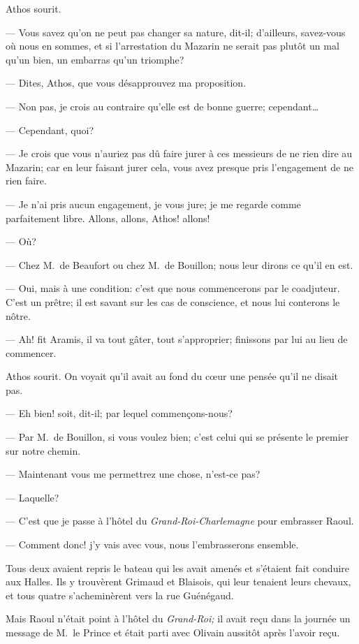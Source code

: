 Athos sourit.

— Vous savez qu'on ne peut pas changer sa nature, dit-il; d'ailleurs, savez-vous où nous en sommes, et si l'arrestation du Mazarin ne serait pas plutôt un mal qu'un bien, un embarras qu'un triomphe?

— Dites, Athos, que vous désapprouvez ma proposition.

— Non pas, je crois au contraire qu'elle est de bonne guerre; cependant\dots

— Cependant, quoi?

— Je crois que vous n'auriez pas dû faire jurer à ces messieurs de ne rien dire au Mazarin; car en leur faisant jurer cela, vous avez presque pris l'engagement de ne rien faire.

— Je n'ai pris aucun engagement, je vous jure; je me regarde comme parfaitement libre. Allons, allons, Athos! allons!

— Où?

— Chez M.~de Beaufort ou chez M.~de Bouillon; nous leur dirons ce qu'il en est.

— Oui, mais à une condition: c'est que nous commencerons par le coadjuteur. C'est un prêtre; il est savant sur les cas de conscience, et nous lui conterons le nôtre.

— Ah! fit Aramis, il va tout gâter, tout s'approprier; finissons par lui au lieu de commencer.

Athos sourit. On voyait qu'il avait au fond du cœur une pensée qu'il ne disait pas.

— Eh bien! soit, dit-il; par lequel commençons-nous?

— Par M.~de Bouillon, si vous voulez bien; c'est celui qui se présente le premier sur notre chemin.

— Maintenant vous me permettrez une chose, n'est-ce pas?

— Laquelle?

— C'est que je passe à l'hôtel du \textit{Grand-Roi-Charlemagne} pour embrasser Raoul.

— Comment donc! j'y vais avec vous, nous l'embrasserons ensemble.

Tous deux avaient repris le bateau qui les avait amenés et s'étaient fait conduire aux Halles. Ils y trouvèrent Grimaud et Blaisois, qui leur tenaient leurs chevaux, et tous quatre s'acheminèrent vers la rue Guénégaud.

Mais Raoul n'était point à l'hôtel du \textit{Grand-Roi;} il avait reçu dans la journée un message de M.~le Prince et était parti avec Olivain aussitôt après l'avoir reçu.
